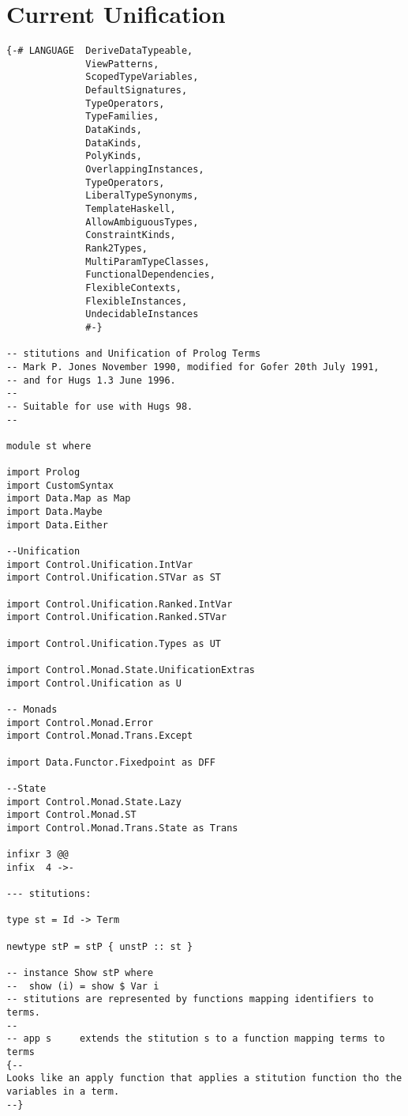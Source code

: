\documentclass[thesis-solanki.tex]{files}
\begin{document}
\section{Current Unification}
\begin{verbatim}
{-# LANGUAGE  DeriveDataTypeable,
              ViewPatterns,
              ScopedTypeVariables,
              DefaultSignatures,
              TypeOperators,
              TypeFamilies,
              DataKinds,
              DataKinds,
              PolyKinds,
              OverlappingInstances,
              TypeOperators,
              LiberalTypeSynonyms,
              TemplateHaskell,
              AllowAmbiguousTypes,
              ConstraintKinds, 
              Rank2Types, 
              MultiParamTypeClasses,
              FunctionalDependencies,
              FlexibleContexts,
              FlexibleInstances,
              UndecidableInstances 
              #-}

-- stitutions and Unification of Prolog Terms
-- Mark P. Jones November 1990, modified for Gofer 20th July 1991,
-- and for Hugs 1.3 June 1996.
--
-- Suitable for use with Hugs 98.
--

module st where

import Prolog
import CustomSyntax
import Data.Map as Map
import Data.Maybe
import Data.Either

--Unification
import Control.Unification.IntVar
import Control.Unification.STVar as ST

import Control.Unification.Ranked.IntVar
import Control.Unification.Ranked.STVar

import Control.Unification.Types as UT

import Control.Monad.State.UnificationExtras
import Control.Unification as U

-- Monads
import Control.Monad.Error
import Control.Monad.Trans.Except

import Data.Functor.Fixedpoint as DFF

--State
import Control.Monad.State.Lazy
import Control.Monad.ST
import Control.Monad.Trans.State as Trans

infixr 3 @@
infix  4 ->-

--- stitutions:

type st = Id -> Term

newtype stP = stP { unstP :: st }

-- instance Show stP where
--  show (i) = show $ Var i
-- stitutions are represented by functions mapping identifiers to terms.
--
-- app s     extends the stitution s to a function mapping terms to terms
{--
Looks like an apply function that applies a stitution function tho the variables in a term.
--}



\end{verbatim}
\end{document}
